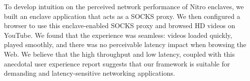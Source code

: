 To develop intuition on the perceived network performance of Nitro enclaves, we
built an enclave application that acts as a SOCKS proxy.  We then configured a
browser to use this enclave-enabled SOCKS proxy and browsed HD videos on
YouTube.  We found that the experience was seamless: videos loaded quickly,
played smoothly, and there was no perceivable latency impact when browsing the
Web.  We believe that the high throughput and low latency, coupled with this
anecdotal user experience report suggests that our framework is suitable for
demanding and latency-sensitive networking applications.

%
%
%
%
%
%

